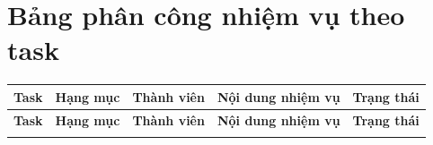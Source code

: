 {}
\section*{Bảng phân công nhiệm vụ theo task}

\begingroup
\small
\renewcommand{\arraystretch}{1.18}
\setlength{\tabcolsep}{4pt}
\begin{longtable}{@{}l>{\raggedright\arraybackslash}p{}>{\raggedright\arraybackslash}p{}>{\raggedright\arraybackslash}p{}l@{}}
\toprule
\textbf{Task} & \textbf{Hạng mục} & \textbf{Thành viên} & \textbf{Nội dung nhiệm vụ} & \textbf{Trạng thái} \\
\midrule
\endfirsthead
\toprule
\textbf{Task} & \textbf{Hạng mục} & \textbf{Thành viên} & \textbf{Nội dung nhiệm vụ} & \textbf{Trạng thái} \\
\midrule
\endhead
\bottomrule
\endlastfoot


\end{longtable}
